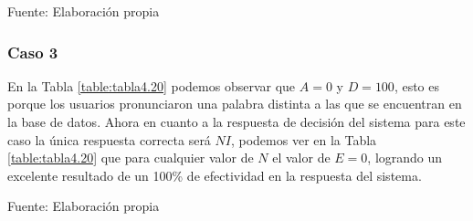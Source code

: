 \begin{center}
\begin{table}[H]
\centering
\caption{\small{Resultados para el caso 2 con U1 dinámico.}}
\label{table:tabla4.19}
\vskip 0.2cm
\begin{center}
\vskip 0.2cm
{\small{Fuente: Elaboración propia}}
\end{center}
\end{table}
\end{center}

\subsubsection{Caso 3}
En la Tabla \ref{table:tabla4.20} podemos observar que $A = 0$ y $D = 100$, esto es porque los usuarios pronunciaron una palabra distinta a las que se encuentran en la base de datos.
\vskip 0.5cm
Ahora en cuanto a la respuesta de decisión del sistema para este caso la única respuesta correcta será $NI$, podemos ver en la Tabla \ref{table:tabla4.20} que para cualquier valor de $N$ el valor de $E = 0$, logrando un excelente resultado de un 100\% de efectividad en la respuesta del sistema.

\begin{center}
\begin{table}[H]
\centering
\caption{\small{Resultados para el caso 3 con U1 dinámico.}}
\label{table:tabla4.20}
\vskip 0.2cm
\begin{center}
\vskip 0.2cm
{\small{Fuente: Elaboración propia}}
\end{center}
\end{table}
\end{center}


